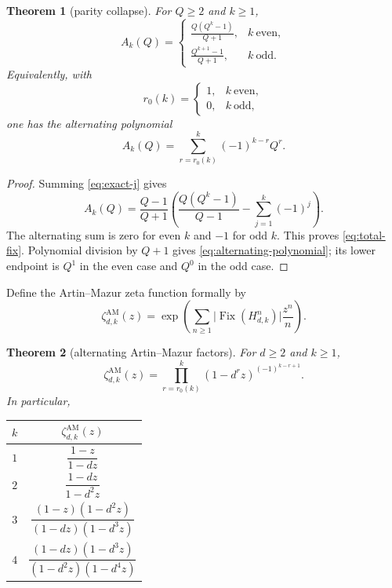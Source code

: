 \documentclass[11pt,a4paper]{amsart}
\newtheorem{theorem}{Theorem}[section]
\theoremstyle{definition}
\theoremstyle{remark}
\newcommand{\Fix}{\operatorname{Fix}}
\newcommand{\card}[1]{\lvert #1\rvert}
\newcommand{\AM}{\mathrm{AM}}
\begin{document}
\begin{theorem}[parity collapse]\label{thm:parity}
For $Q\geq2$ and $k\geq1$,
\begin{equation}\label{eq:total-fix}
 A_k(Q)=
 \begin{cases}
 \displaystyle \frac{Q(Q^k-1)}{Q+1},&k\ \text{even},\\[6pt]
 \displaystyle \frac{Q^{k+1}-1}{Q+1},&k\ \text{odd}.
 \end{cases}
\end{equation}
Equivalently, with
\[
 r_0(k)=\begin{cases}1,&k\ \text{even},\\0,&k\ \text{odd},\end{cases}
\]
one has the alternating polynomial
\begin{equation}\label{eq:alternating-polynomial}
 A_k(Q)=\sum_{r=r_0(k)}^k(-1)^{k-r}Q^r.
\end{equation}
\end{theorem}

\begin{proof}
Summing \eqref{eq:exact-j} gives
\[
 A_k(Q)=\frac{Q-1}{Q+1}
 \left(\frac{Q(Q^k-1)}{Q-1}-\sum_{j=1}^k(-1)^j\right).
\]
The alternating sum is zero for even $k$ and $-1$ for odd $k$.  This proves
\eqref{eq:total-fix}.  Polynomial division by $Q+1$ gives
\eqref{eq:alternating-polynomial}; its lower endpoint is $Q^1$ in the even
case and $Q^0$ in the odd case.
\end{proof}

Define the Artin--Mazur zeta function formally by
\[
 \zeta^{\AM}_{d,k}(z)=
 \exp\!\left(\sum_{n\geq1}
 \card{\Fix(H_{d,k}^n)}\frac{z^n}{n}\right).
\]

\begin{theorem}[alternating Artin--Mazur factors]\label{thm:am-zeta}
For $d\geq2$ and $k\geq1$,
\begin{equation}\label{eq:am-zeta}
 \boxed{\displaystyle
 \zeta^{\AM}_{d,k}(z)=
 \prod_{r=r_0(k)}^k
 (1-d^r z)^{(-1)^{k-r+1}}.}
\end{equation}
In particular,
\begin{center}
\begin{tabular}{c@{\qquad}c}
\toprule
$k$ & $\zeta^{\AM}_{d,k}(z)$\\
\midrule
$1$ & $\dfrac{1-z}{1-dz}$\\[5pt]
$2$ & $\dfrac{1-dz}{1-d^2z}$\\[5pt]
$3$ & $\dfrac{(1-z)(1-d^2z)}{(1-dz)(1-d^3z)}$\\[5pt]
$4$ & $\dfrac{(1-dz)(1-d^3z)}{(1-d^2z)(1-d^4z)}$\\
\bottomrule
\end{tabular}
\end{center}
\end{theorem}
\end{document}
